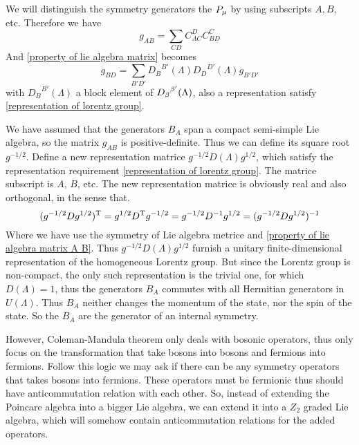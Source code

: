     We will distinguish the symmetry generators the $P_\mu$ by using subscripts $A,B$, etc. Therefore we have
    \begin{equation}
      g_{AB} = \sum_{CD}C^{D}_{AC}C^{C}_{BD}
    \end{equation}
    And \eqref{property of lie algebra matrix} becomes
    \begin{equation}\label{property of lie algebra matrix A B}
    g_{BD} = \sum_{B'D'}
    {D_{B}}^{B'}(\Lambda)
    {D_{D}}^{D'}(\Lambda)
    g_{B'D'}
    \end{equation} 
    with ${D_{B}}^{B'}(\Lambda)$ a block element of ${D_{\beta}}^{\beta'}(\Lambda)$, also a representation satisfy \eqref{representation of lorentz group}.
    
    We have assumed that the generators $B_A$ span a compact semi-simple Lie algebra, so the matrix $g_{AB}$ is positive-definite. Thus we can define its square root $g^{-1/2}$. Define a new representation matrice $g^{-1/2}D(\Lambda)g^{1/2}$, which satisfy the representation requirement \eqref{representation of lorentz group}. The matrice subscript is $A$, $B$, etc. The new representation matrice is obviously real and also orthogonal, in the sense that.
    \begin{equation} 
    (g^{-1/2}D g^{1/2})^{\text{T}}=
    g^{1/2}D^{\text{T}}g^{-1/2}=
    g^{-1/2}D^{-1}g^{1/2} =
    (g^{-1/2}D g^{1/2})^{-1}
    \end{equation}
    Where we have use the symmetry of Lie algebra metrice and \eqref{property of lie algebra matrix A B}. Thus $g^{-1/2}D(\Lambda)g^{1/2}$ furnish a unitary finite-dimensional representation of the homogeneous Lorentz group. But since the Lorentz group is non-compact, the only such representation is the trivial one, for which $D(\Lambda)=1$, thus the generators $B_A$ commutes with all Hermitian generators in $U(\Lambda)$. Thus $B_A$ neither changes the momentum of the state, nor the spin of the state. So the $B_A$ are the generator of an internal symmetry.
    
     
    However, Coleman-Mandula theorem only deals with bosonic operators, thus only focus on the transformation that take bosons into bosons and fermions into fermions. Follow this logic we may ask if there can be any symmetry operators that takes bosons into fermions. These operators must be fermionic thus should have anticommutation relation with each other. So, instead of extending the Poincare algebra into a bigger Lie algebra, we can extend it into a $Z_2$ graded Lie algebra, which will somehow contain anticommutation relations for the added operators.
    
